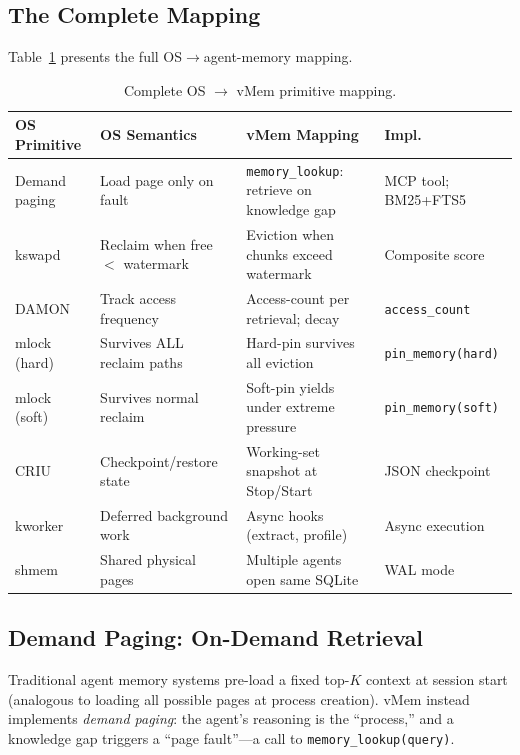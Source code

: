 \documentclass[10pt,twocolumn]{article}
\begin{document}
\subsection{The Complete Mapping}

Table~\ref{tab:mapping} presents the full OS$\to$agent-memory mapping.

\begin{table}[t]
\centering
\caption{Complete OS $\to$ vMem primitive mapping.}
\label{tab:mapping}
\footnotesize
\begin{tabular}{lp{4.2cm}p{4.8cm}p{3cm}}
\toprule
\textbf{OS Primitive} & \textbf{OS Semantics} & \textbf{vMem Mapping} & \textbf{Impl.} \\
\midrule
Demand paging & Load page only on fault & \texttt{memory\_lookup}: retrieve on knowledge gap & MCP tool; BM25+FTS5 \\
\addlinespace
kswapd & Reclaim when free $<$ watermark & Eviction when chunks exceed watermark & Composite score \\
\addlinespace
DAMON & Track access frequency & Access-count per retrieval; decay & \texttt{access\_count} \\
\addlinespace
mlock (hard) & Survives ALL reclaim paths & Hard-pin survives all eviction & \texttt{pin\_memory(hard)} \\
\addlinespace
mlock (soft) & Survives normal reclaim & Soft-pin yields under extreme pressure & \texttt{pin\_memory(soft)} \\
\addlinespace
CRIU & Checkpoint/restore state & Working-set snapshot at Stop/Start & JSON checkpoint \\
\addlinespace
kworker & Deferred background work & Async hooks (extract, profile) & Async execution \\
\addlinespace
shmem & Shared physical pages & Multiple agents open same SQLite & WAL mode \\
\bottomrule
\end{tabular}
\end{table}

\subsection{Demand Paging: On-Demand Retrieval}

Traditional agent memory systems pre-load a fixed top-$K$ context at session start (analogous to loading all possible pages at process creation). vMem instead implements \emph{demand paging}: the agent's reasoning is the ``process,'' and a knowledge gap triggers a ``page fault''---a call to \texttt{memory\_lookup(query)}.
\end{document}
